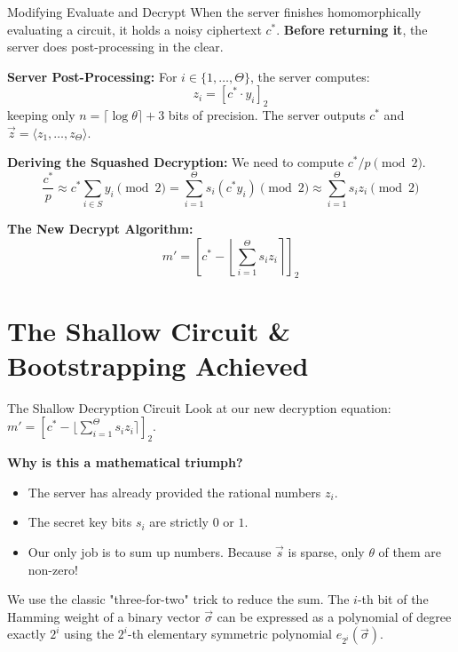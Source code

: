 \documentclass[10pt, aspectratio=169]{beamer}
\begin{document}
\begin{frame}{Modifying Evaluate and Decrypt}
    When the server finishes homomorphically evaluating a circuit, it holds a noisy ciphertext $c^*$. \textbf{Before returning it}, the server does post-processing in the clear.
    \pause

    \vspace{0.2cm}
    \textbf{Server Post-Processing:}
    For $i \in \{1, \dots, \Theta\}$, the server computes:
    $$z_i = [c^* \cdot y_i]_2$$
    keeping only $n = \lceil \log \theta \rceil + 3$ bits of precision. The server outputs $c^*$ and $\vec{z} = \langle z_1, \dots, z_\Theta \rangle$.
    \pause

    \vspace{0.2cm}
    \textbf{Deriving the Squashed Decryption:}
    We need to compute $c^*/p \pmod 2$.
    $$\frac{c^*}{p} \approx c^* \sum_{i \in S} y_i \pmod 2 = \sum_{i=1}^\Theta s_i (c^* y_i) \pmod 2 \approx \sum_{i=1}^\Theta s_i z_i \pmod 2$$
    \pause
    
    \textbf{The New Decrypt Algorithm:}
    $$m' = \left[ c^* - \left\lfloor \sum_{i=1}^\Theta s_i z_i \right\rceil \right]_2$$
\end{frame}

\section{The Shallow Circuit \& Bootstrapping Achieved}

\begin{frame}{The Shallow Decryption Circuit}
    Look at our new decryption equation: $m' = \left[ c^* - \lfloor \sum_{i=1}^\Theta s_i z_i \rceil \right]_2$.
    \pause
    
    \vspace{0.2cm}
    \textbf{Why is this a mathematical triumph?}
    \begin{itemize}
        \item The server has already provided the rational numbers $z_i$.
        \item The secret key bits $s_i$ are strictly $0$ or $1$.
        \item Our only job is to sum up numbers. Because $\vec{s}$ is sparse, only $\theta$ of them are non-zero!
    \end{itemize}
    \pause

    \vspace{0.2cm}
    \begin{lemma}
    We use the classic "three-for-two" trick to reduce the sum. The $i$-th bit of the Hamming weight of a binary vector $\vec{\sigma}$ can be expressed as a polynomial of degree exactly $2^i$ using the $2^i$-th elementary symmetric polynomial $e_{2^i}(\vec{\sigma})$.
    \end{lemma}
\end{frame}
\end{document}
